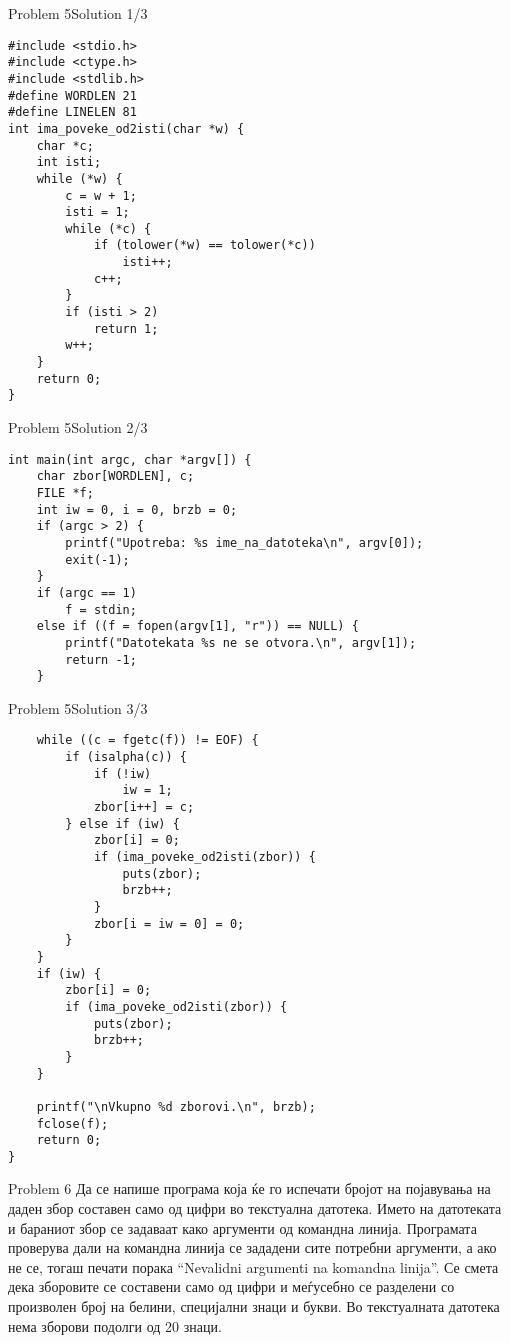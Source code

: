 \begin{frame}[fragile]{Problem 5}{Solution 1/3}
\begin{lstlisting}
#include <stdio.h>
#include <ctype.h>
#include <stdlib.h>
#define WORDLEN 21
#define LINELEN 81
int ima_poveke_od2isti(char *w) {
    char *c;
    int isti;
    while (*w) {
        c = w + 1;
        isti = 1;
        while (*c) {
            if (tolower(*w) == tolower(*c))
                isti++;
            c++;
        }
        if (isti > 2)
            return 1;
        w++;
    }
    return 0;
}
\end{lstlisting}
\end{frame}

\begin{frame}[fragile]{Problem 5}{Solution 2/3}
\begin{lstlisting}
int main(int argc, char *argv[]) {
    char zbor[WORDLEN], c;
    FILE *f;
    int iw = 0, i = 0, brzb = 0;
    if (argc > 2) {
        printf("Upotreba: %s ime_na_datoteka\n", argv[0]);
        exit(-1);
    }
    if (argc == 1)
        f = stdin;
    else if ((f = fopen(argv[1], "r")) == NULL) {
        printf("Datotekata %s ne se otvora.\n", argv[1]);
        return -1;
    }
\end{lstlisting}
\end{frame}

\begin{frame}[fragile]{Problem 5}{Solution 3/3}
\begin{lstlisting}
    while ((c = fgetc(f)) != EOF) {
        if (isalpha(c)) {
            if (!iw)
                iw = 1;
            zbor[i++] = c;
        } else if (iw) {
            zbor[i] = 0;
            if (ima_poveke_od2isti(zbor)) {
                puts(zbor);
                brzb++;
            }
            zbor[i = iw = 0] = 0;
        }
    }
    if (iw) {
        zbor[i] = 0;
        if (ima_poveke_od2isti(zbor)) {
            puts(zbor);
            brzb++;
        }
    }

    printf("\nVkupno %d zborovi.\n", brzb);
    fclose(f);
    return 0;
}
\end{lstlisting}
\end{frame}

\begin{frame}{Problem 6}
Да се напише програма која ќе го испечати бројот на појавувања на даден збор
составен само од цифри во текстуална датотека. Името на датотеката и бараниот
збор се задаваат како аргументи од командна линија. Програмата проверува дали на
командна линија се зададени сите потребни аргументи, а ако не се, тогаш печати
порака ``Nevalidni argumenti na komandna linija''. Се смета дека зборовите се
составени само од цифри и меѓусебно се разделени со произволен број на белини,
специјални знаци и букви. Во текстуалната датотека нема зборови подолги од 20
знаци.    
\end{frame}


